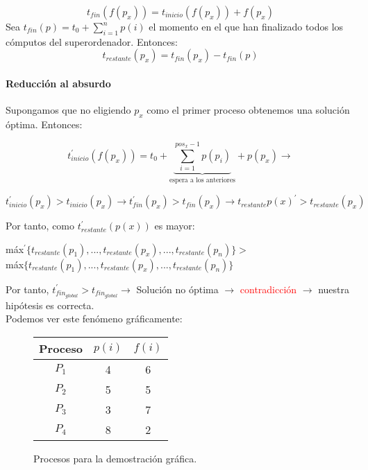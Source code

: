 \documentclass[12pt,spanish]{article}
\begin{document}
\begin{equation*}
	t_{fin}(f(p_x))= t_{inicio}(f(p_x)) + f(p_x)
\end{equation*}
Sea $t_{fin}(p)=t_0 + \sum^{n}_{i=1}p(i)$ el momento en el que han finalizado todos los cómputos del superordenador. Entonces:
\begin{equation*}
	t_{restante}(p_x)=t_{fin}(p_x) - t_{fin}(p)
\end{equation*}
\paragraph{Reducción al absurdo}
Supongamos que no eligiendo $p_x$ como el primer proceso obtenemos una solución óptima. Entonces:

\begin{equation*}
	t_{inicio}^{\prime}(f(p_x))= t_0 + \underbrace{\sum^{pos_x-1}_{i=1} p(p_i)}_{\text{espera a los anteriores}} + p(p_x) \rightarrow 
\end{equation*}
	
\begin{equation*}
 t_{inicio}^{\prime}(p_x) > t_{inicio}(p_x) \rightarrow 
	t_{fin}^{\prime}(p_x) > t_{fin}(p_x) \rightarrow t_{restante}p(x)^{\prime} > t_{restante}(p_x)
\end{equation*}

Por tanto, como $t_{restante}^{\prime}(p(x))$ es mayor:
\begin{center}
máx$^{\prime}\{t_{restante}(p_1),...,t_{restante}(p_x),...,t_{restante}(p_n)\} > $ \\máx$\{t_{restante}(p_1),...,t_{restante}(p_x),...,t_{restante}(p_n)\}$
\end{center}
Por tanto, $t_{fin_{global}}^{\prime}> t_{fin_{global}} \rightarrow $ Solución no óptima $\rightarrow$ \textcolor{red}{contradicción} $\rightarrow$ nuestra hipótesis es correcta.\\
Podemos ver este fenómeno gráficamente:
\begin{figure}[H]
\centering
\begin{tabular}{|c|c|c|}
\hline
\textbf{Proceso} & \textbf{$p(i)$} & \textbf{$f(i)$} \\
\hline
$P_1$ & 4 & 6 \\
\hline
$P_2$ & 5 & 5 \\
\hline
$P_3$ & 3 & 7 \\
\hline
$P_4$ & 8 & 2 \\
\hline
\end{tabular}
\caption{Procesos para la demostración gráfica.}
\end{figure}
\end{document}

